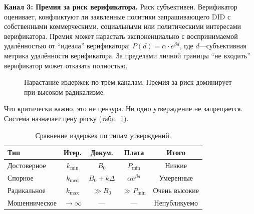 \documentclass[11pt,a4paper,twocolumn]{article}
\begin{document}
\textbf{Канал 3: Премия за риск верификатора.} Риск субъективен. Верификатор оценивает, конфликтуют ли заявленные политики запрашивающего DID с собственными коммерческими, социальными или политическими интересами верификатора. Премия может нарастать экспоненциально с воспринимаемой удалённостью от ``идеала'' верификатора: $P(d) = \alpha \cdot e^{\beta d}$, где $d$---субъективная метрика удалённости верификатора. За пределами личной границы ``не входить'' верификатор может отказать полностью.

\begin{figure}[ht]
\centering
{}
\caption{Нарастание издержек по трём каналам. Премия за риск доминирует при высоком радикализме.}
\label{fig:radicalism}
\end{figure}

Что критически важно, это не цензура. Ни одно утверждение не запрещается. Система назначает цену риску (табл.~\ref{tab:costs}).

\begin{table}[ht]
\centering
\caption{Сравнение издержек по типам утверждений.}
\label{tab:costs}
\footnotesize
\begin{tabular}{@{}lcccc@{}}
\toprule
\textbf{Тип} & \textbf{Итер.} & \textbf{Докум.} & \textbf{Плата} & \textbf{Итого} \\
\midrule
Достоверное & $k_{\min}$ & $B_0$ & $P_{\min}$ & Низкие \\
Спорное & $k_{\text{med}}$ & $B_0{+}k\Delta$ & $\alpha e^{\beta d}$ & Умеренные \\
Радикальное & $k_{\max}$ & $\gg B_0$ & $\gg P_{\min}$ & Очень высокие \\
Мошенническое & $\to\infty$ & --- & --- & Непубликуемо \\
\bottomrule
\end{tabular}
\end{table}
\end{document}
